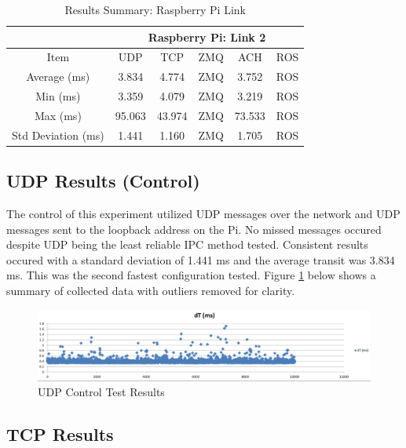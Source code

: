 \begin{table}[h]
\caption{Results Summary: Raspberry Pi Link}
\label{table:results summary rpi}
\begin{center}
\begin{tabular}{c|c||c||c||c||c|}
\cline{2-6}
& \multicolumn{5}{c|}{Raspberry Pi: Link 2}\\
\hline
\multicolumn{1}{|c|}{Item} & UDP & TCP & ZMQ & ACH  & ROS\\
\hline
\multicolumn{1}{|c|}{Average (ms)} & 3.834 & 4.774 & ZMQ & 3.752 & ROS\\
\hline
\multicolumn{1}{|c|}{Min (ms)} & 3.359 & 4.079 & ZMQ & 3.219 & ROS\\
\hline
\multicolumn{1}{|c|}{Max (ms)} & 95.063 & 43.974 & ZMQ & 73.533 & ROS\\
\hline
\multicolumn{1}{|c|}{Std Deviation (ms)} & 1.441 & 1.160 & ZMQ & 1.705 & ROS\\
\hline
\end{tabular}
\end{center} 
\end{table}

\subsection{UDP Results (Control)}

The control of this experiment utilized UDP messages over the network and UDP messages sent to the loopback address on the Pi. No missed messages occured despite UDP being the least reliable IPC method tested. Consistent results occured with a standard deviation of 1.441 ms and the average transit was 3.834 ms. This was the second fastest configuration tested. Figure \ref{fig:UDP results} below shows a summary of collected data with outliers removed for clarity.

\begin{figure}[thpb]
 \centering
 \includegraphics[width=1.0\columnwidth]{./images/udp2udp.png}
  \caption{UDP Control Test Results}  
  \label{fig:UDP results}
\end{figure} 

\subsection{TCP Results}

